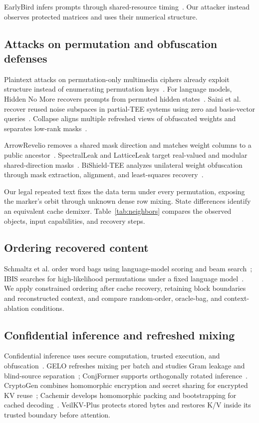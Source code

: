 EarlyBird infers prompts through shared-resource timing~\cite{earlybird}. Our attacker instead observes protected matrices and uses their numerical structure.

\subsection{Attacks on permutation and obfuscation defenses}
Plaintext attacks on permutation-only multimedia ciphers already exploit structure instead of enumerating permutation keys~\cite{permutationciphers}. For language models, Hidden No More recovers prompts from permuted hidden states~\cite{hidden}. Saini et al. recover reused noise subspaces in partial-TEE systems using zero and basis-vector queries~\cite{partialtee}. Collapse aligns multiple refreshed views of obfuscated weights and separates low-rank masks~\cite{collapse}.

ArrowRevelio removes a shared mask direction and matches weight columns to a public ancestor~\cite{arrowrevelio}. SpectralLeak and LatticeLeak target real-valued and modular shared-direction masks~\cite{spectralleak}. BiShield-TEE analyzes unilateral weight obfuscation through mask extraction, alignment, and least-squares recovery~\cite{bishield}.

Our legal repeated text fixes the data term under every permutation, exposing the marker's orbit through unknown dense row mixing. State differences identify an equivalent cache demixer. Table~\ref{tab:neighbors} compares the observed objects, input capabilities, and recovery steps.

\subsection{Ordering recovered content}
Schmaltz et al. order word bags using language-model scoring and beam search~\cite{wordorder}; IBIS searches for high-likelihood permutations under a fixed language model~\cite{ibis}. We apply constrained ordering after cache recovery, retaining block boundaries and reconstructed context, and compare random-order, oracle-bag, and context-ablation conditions.

\subsection{Confidential inference and refreshed mixing}
Confidential inference uses secure computation, trusted execution, and obfuscation~\cite{sok}. GELO refreshes mixing per batch and studies Gram leakage and blind-source separation~\cite{gelo}; ConjFormer supports orthogonally rotated inference~\cite{conjformer}. CryptoGen combines homomorphic encryption and secret sharing for encrypted KV reuse~\cite{cryptogen}; Cachemir develops homomorphic packing and bootstrapping for cached decoding~\cite{cachemir}. VeilKV-Plus protects stored bytes and restores K/V inside its trusted boundary before attention.

